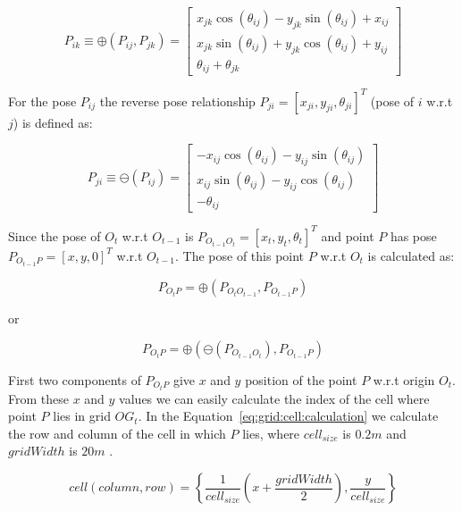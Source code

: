\begin{equation}
P_{ik} \equiv \oplus (P_{ij}, P_{jk}) = \left[ \begin{array}{c}
x_{jk}\cos(\theta_{ij})-y_{jk}\sin(\theta_{ij})+x_{ij} \\
x_{jk}\sin(\theta_{ij})+y_{jk}\cos(\theta_{ij})+y_{ij} \\
\theta_{ij}+\theta_{jk} \end{array} \right] 
\end{equation}

For the pose $P_{ij}$ the reverse pose relationship $P_{ji}=[x_{ji}, y_{ji}, \theta_{ji}]^T$ (pose of $i$ w.r.t $j$) is defined as:

\begin{equation}
P_{ji} \equiv \ominus (P_{ij}) = \left[ \begin{array}{c}
-x_{ij}\cos(\theta_{ij})-y_{ij}\sin(\theta_{ij}) \\
x_{ij}\sin(\theta_{ij})-y_{ij}\cos(\theta_{ij}) \\
-\theta_{ij} \end{array} \right] 
\end{equation}

Since the pose of $O_t$ w.r.t $O_{t-1}$ is $P_{O_{t-1}O_t}=[x_t,y_t,\theta_t]^T$ and point $P$ has pose $P_{O_{t-1}P}=[x,y,0]^T$ w.r.t $O_{t-1}$. The pose of this point $P$ w.r.t $O_t$ is calculated as:

\begin{equation}
P_{O_tP} = \oplus (P_{O_tO_{t-1}}, P_{O_{t-1}P})
\end{equation}

or

\begin{equation}
P_{O_tP} = \oplus (\ominus(P_{O_{t-1}O_t}), P_{O_{t-1}P})
\end{equation}

First two components of $P_{O_tP}$ give $x$ and $y$ position of the point $P$ w.r.t origin $O_t$. From these $x$ and $y$ values we can easily calculate the index of the cell where point $P$ lies in grid $OG_t$. In the Equation~\ref{eq:grid:cell:calculation} we calculate the row and column of the cell in which $P$ lies, where $cell_{size}$ is $0.2m$ and $gridWidth$ is $20m$ .

\begin{equation}
cell(column,row)=\left\{\frac{1}{cell_{size}}(x+\frac{gridWidth}{2}),\frac{y}{cell_{size}} \right\}
\label{eq:grid:cell:calculation}
\end{equation}



